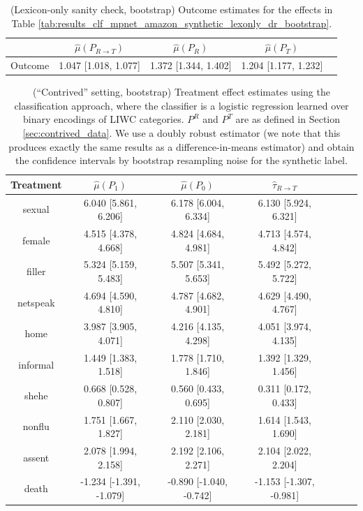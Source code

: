 \documentclass{article}
\begin{document}
\begin{table}[!ht]
\centering
\begin{tabular}{c|cccc}
\toprule
    & $\hat{\mu}(P_{R \rightarrow T})$   & $\hat{\mu}(P_R)$     & $\hat{\mu}(P_T)$     \\
\midrule
    Outcome & 1.047 [1.018, 1.077]               & 1.372 [1.344, 1.402] & 1.204 [1.177, 1.232] \\
\bottomrule
\end{tabular}
\caption{(Lexicon-only sanity check, bootstrap) Outcome estimates for the effects in Table \ref{tab:results_clf_mpnet_amazon_synthetic_lexonly_dr_bootstrap}.}
\label{tab:results_clf_mpnet_amazon_synthetic_lexonly_dr_bootstrap_outcome}
\end{table}

\begin{table}[!ht]
\centering
\begin{tabular}{c|cccccc}
\toprule
    Treatment   & $\hat{\mu}(P_1)$        & $\hat{\mu}(P_0)$        & $\hat{\tau}_{R \rightarrow T}$   \\
\midrule
    sexual      & 6.040 [5.861, 6.206]    & 6.178 [6.004, 6.334]    & 6.130 [5.924, 6.321]             \\
    female      & 4.515 [4.378, 4.668]    & 4.824 [4.684, 4.981]    & 4.713 [4.574, 4.842]             \\
    filler      & 5.324 [5.159, 5.483]    & 5.507 [5.341, 5.653]    & 5.492 [5.272, 5.722]             \\
    netspeak    & 4.694 [4.590, 4.810]    & 4.787 [4.682, 4.901]    & 4.629 [4.490, 4.767]             \\
    home        & 3.987 [3.905, 4.071]    & 4.216 [4.135, 4.298]    & 4.051 [3.974, 4.135]             \\
    informal    & 1.449 [1.383, 1.518]    & 1.778 [1.710, 1.846]    & 1.392 [1.329, 1.456]             \\
    shehe       & 0.668 [0.528, 0.807]    & 0.560 [0.433, 0.695]    & 0.311 [0.172, 0.433]             \\
    nonflu      & 1.751 [1.667, 1.827]    & 2.110 [2.030, 2.181]    & 1.614 [1.543, 1.690]             \\
    assent      & 2.078 [1.994, 2.158]    & 2.192 [2.106, 2.271]    & 2.104 [2.022, 2.204]             \\
    death       & -1.234 [-1.391, -1.079] & -0.890 [-1.040, -0.742] & -1.153 [-1.307, -0.981]          \\
\bottomrule
\end{tabular}
\caption{(``Contrived'' setting, bootstrap) Treatment effect estimates using the classification approach, where the classifier is a logistic regression learned over binary encodings of LIWC categories. $P^R$ and $P^T$ are as defined in Section \ref{sec:contrived_data}. We use a doubly robust estimator (we note that this produces exactly the same results as a difference-in-means estimator) and obtain the confidence intervals by bootstrap resampling noise for the synthetic label.}
\label{tab:results_clf_liwc_contrived_bootstrap}
\end{table}
\end{document}
